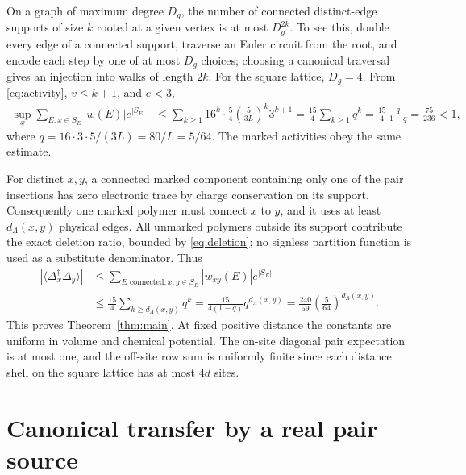 \documentclass[11pt]{article}
\newcommand{\Deltaop}{\Delta}
\begin{document}
On a graph of maximum degree $D_g$, the number of connected distinct-edge supports of size $k$ rooted at a given vertex is at most $D_g^{2k}$. To see this, double every edge of a connected support, traverse an Euler circuit from the root, and encode each step by one of at most $D_g$ choices; choosing a canonical traversal gives an injection into walks of length $2k$. For the square lattice, $D_g=4$. From \eqref{eq:activity}, $v\le k+1$, and $e<3$,
\begin{align}
 \sup_x\sum_{E:x\in S_E}|w(E)|e^{|S_E|}
 &\le\sum_{k\ge1}16^k\cdot\frac54\left(\frac{5}{3L}\right)^k3^{k+1}
 =\frac{15}{4}\sum_{k\ge1}q^k=\frac{15}{4}\,\frac{q}{1-q}=\frac{75}{236}<1,
 \label{eq:budget}
\end{align}
where $q=16\cdot3\cdot5/(3L)=80/L=5/64$. The marked activities obey the same estimate.

For distinct $x,y$, a connected marked component containing only one of the pair insertions has zero electronic trace by charge conservation on its support. Consequently one marked polymer must connect $x$ to $y$, and it uses at least $d_\Lambda(x,y)$ physical edges. All unmarked polymers outside its support contribute the exact deletion ratio, bounded by \eqref{eq:deletion}; no signless partition function is used as a substitute denominator. Thus
\begin{align*}
 |\langle\Deltaop_x^\dagger\Deltaop_y\rangle|
 &\le \sum_{E\text{ connected}:x,y\in S_E}|w_{xy}(E)|e^{|S_E|}\\
 &\le \frac{15}{4}\sum_{k\ge d_\Lambda(x,y)}q^k
 =\frac{15}{4(1-q)}q^{d_\Lambda(x,y)}
 =\frac{240}{59}\left(\frac{5}{64}\right)^{d_\Lambda(x,y)}.
\end{align*}
This proves Theorem~\ref{thm:main}. At fixed positive distance the constants are uniform in volume and chemical potential. The on-site diagonal pair expectation is at most one, and the off-site row sum is uniformly finite since each distance shell on the square lattice has at most $4d$ sites.

\section{Canonical transfer by a real pair source}
\end{document}
